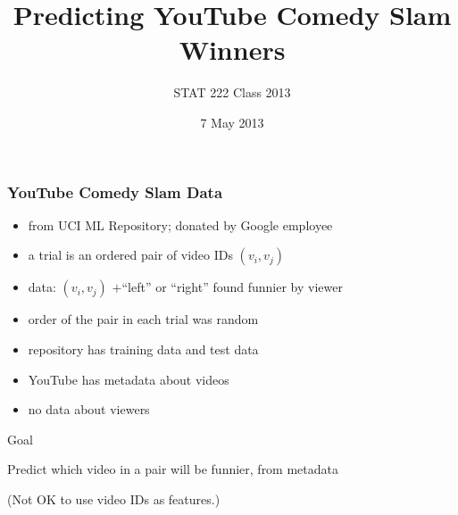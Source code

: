 \documentclass[fleqn]{beamer}
\begin{document}
\title[] %
{Predicting YouTube Comedy Slam Winners}

\author{STAT 222 Class 2013}


\date{7 May 2013 }
\subject{Statistical Machine Learning}


\begin{frame}

\titlepage


\end{frame}


\begin{frame}
\frametitle{YouTube Comedy Slam Data}

	\begin{itemize}
	   \item from UCI ML Repository; donated by Google employee
	   \item a trial is an ordered pair of video IDs $(v_i, v_j)$
	   \item data: $(v_i, v_j)$ $+$``left'' or ``right'' found funnier by viewer
	   \item order of the pair in each trial was random
	   \item repository has training data and test data
	   \item YouTube has metadata about videos
	   \item no data about viewers
	\end{itemize}

	\begin{beamerboxesrounded}{Goal}
	\begin{center}
	    Predict which video in a pair will be funnier, from metadata
         \end{center}
         \begin{center}
         \small{(Not OK to use video IDs as features.)}
         \end{center}
	\end{beamerboxesrounded}
\end{frame}
\end{document}

